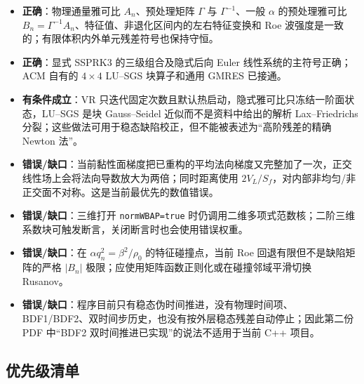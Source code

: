 \documentclass[UTF8,11pt,a4paper]{ctexart}
\newcommand{\statusok}{\textcolor{OKGreen}{\textbf{正确}}}
\newcommand{\statusconditional}{\textcolor{WarnOrange}{\textbf{有条件成立}}}
\newcommand{\statuserror}{\textcolor{ErrorRed}{\textbf{错误/缺口}}}
\newcommand{\code}[1]{\nolinkurl{#1}}
\begin{document}
\begin{itemize}
  \item \statusok：物理通量雅可比 $A_n$、预处理矩阵 $\Gamma$ 与 $\Gamma^{-1}$、一般 $\alpha$ 的预处理雅可比 $B_n=\Gamma^{-1}A_n$、特征值、非退化区间内的左右特征变换和 Roe 波强度是一致的；有限体积内外单元残差符号也保持守恒。
  \item \statusok：显式 SSPRK3 的三级组合及隐式后向 Euler 线性系统的主符号正确；ACM 自有的 $4\times4$ LU--SGS 块算子和通用 GMRES 已接通。
  \item \statusconditional：VR 只迭代固定次数且默认热启动，隐式雅可比只冻结一阶面状态，LU--SGS 是块 Gauss--Seidel 近似而不是资料中给出的解析 Lax--Friedrichs 分裂；这些做法可用于稳态缺陷校正，但不能被表述为“高阶残差的精确 Newton 法”。
  \item \statuserror：当前黏性面梯度把已重构的平均法向梯度又完整加了一次，正交线性场上会将法向导数放大为两倍；同时距离使用 $2V_L/S_f$，对内部非均匀/非正交面不对称。这是当前最优先的数值错误。
  \item \statuserror：三维打开 \code{normWBAP=true} 时仍调用二维多项式范数核；二阶三维系数块可触发断言，关闭断言时也会使用错误权重。
  \item \statuserror：在 $\alpha q_n^2=\beta^2/\rho_0$ 的特征碰撞点，当前 Roe 回退有限但不是缺陷矩阵的严格 $|B_n|$ 极限；应使用矩阵函数正则化或在碰撞邻域平滑切换 Rusanov。
  \item \statuserror：程序目前只有稳态伪时间推进，没有物理时间项、BDF1/BDF2、双时间步历史，也没有按外层稳态残差自动停止；因此第二份 PDF 中“BDF2 双时间推进已实现”的说法不适用于当前 C++ 项目。
\end{itemize}

\subsection{优先级清单}
\end{document}
